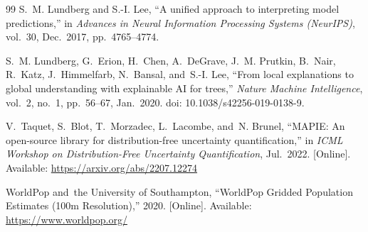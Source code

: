 \documentclass[conference]{IEEEtran}
\begin{document}
\begin{thebibliography}{99}
S.~M. Lundberg and S.-I. Lee, ``A unified approach to interpreting
model predictions,'' in \textit{Advances in Neural Information
Processing Systems (NeurIPS)}, vol.~30, Dec.\ 2017, pp.~4765--4774.

S.~M. Lundberg, G.~Erion, H.~Chen, A.~DeGrave, J.~M. Prutkin,
B.~Nair, R.~Katz, J.~Himmelfarb, N.~Bansal, and~S.-I. Lee,
``From local explanations to global understanding with explainable
AI for trees,'' \textit{Nature Machine Intelligence}, vol.~2,
no.~1, pp.~56--67, Jan.\ 2020. doi: 10.1038/s42256-019-0138-9.

V.~Taquet, S.~Blot, T.~Morzadec, L.~Lacombe, and~N. Brunel,
``MAPIE: An open-source library for distribution-free uncertainty
quantification,'' in \textit{ICML Workshop on Distribution-Free
Uncertainty Quantification}, Jul.\ 2022. [Online]. Available:
\url{https://arxiv.org/abs/2207.12274}

WorldPop and~the University of Southampton, ``WorldPop Gridded
Population Estimates (100m Resolution),'' 2020. [Online]. Available:
\url{https://www.worldpop.org/}

\end{thebibliography}
\end{document}
